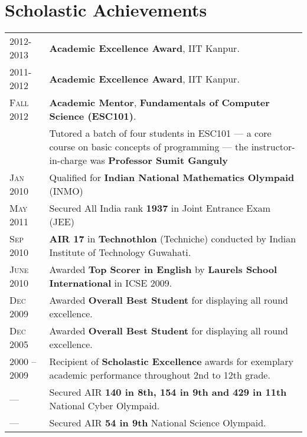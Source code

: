 \documentclass[a4paper,10pt]{article} %
\begin{document}
\section{Scholastic Achievements}

\begin{tabular}{>{\raggedleft}p{2.2cm}p{15cm}}

    \textsc{2012-2013}   & \textbf{Academic Excellence Award}, IIT Kanpur. \\
    \textsc{2011-2012}   & \textbf{Academic Excellence Award}, IIT Kanpur. \\
    \textsc{Fall 2012}   & \textbf{Academic Mentor}, \textbf{Fundamentals of Computer Science (ESC101)}. \\
                         & \footnotesize{Tutored a batch of four students in ESC101 --- a core course on
                            basic concepts of programming --- the instructor-in-charge was \textbf{Professor
                            Sumit Ganguly}}\\
    \textsc{Jan 2010}    & Qualified for \textbf{Indian National Mathematics Olympaid} (INMO) \\
    \textsc{May 2011}    & Secured All India rank \textbf{1937} in Joint Entrance Exam (JEE) \\
    \textsc{Sep 2010}    & \textbf{AIR 17} in \textbf{Technothlon} (Techniche) conducted by Indian Institute of Technology Guwahati. \\
    \textsc{June 2010}   & Awarded \textbf{Top Scorer in English} by \textbf{Laurels School International} in ICSE 2009. \\
    \textsc{Dec 2009}    & Awarded \textbf{Overall Best Student} for displaying all round excellence. \\
    \textsc{Dec 2005}    & Awarded \textbf{Overall Best Student} for displaying all round excellence. \\
    \textsc{2000 -- 2009} & Recipient of \textbf{Scholastic Excellence} awards for exemplary academic
                           performance throughout 2nd to 12th grade. \\
    \textsc{---} & Secured AIR \textbf{140 in 8th, 154 in 9th and 429 in 11th} National Cyber Olympaid.\\
    \textsc{---} & Secured AIR \textbf{54 in 9th} National Science Olympaid.\\

\end{tabular}

\end{document}
